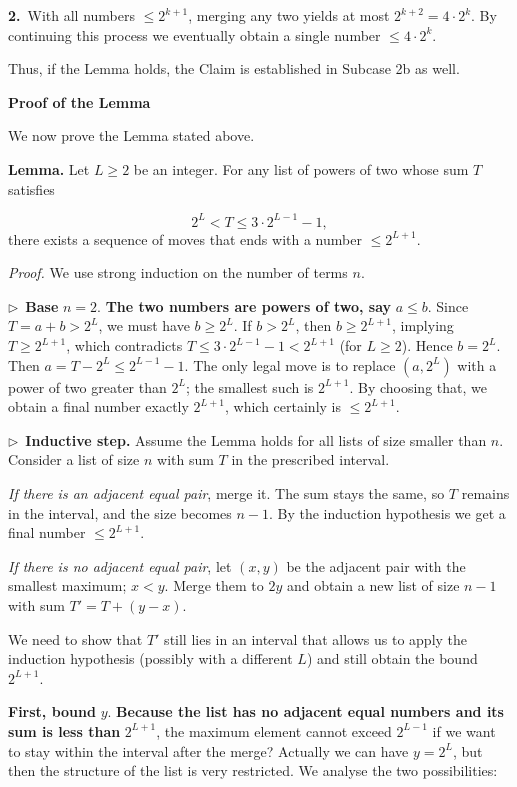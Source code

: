 \documentclass{llmxive}
\providecommand{\solutionheading}[1]{\par\smallskip\noindent\textbf{#1}\par}
\providecommand{\compactbullet}[1]{\par\noindent$\triangleright$~#1\par}
\providecommand{\compactnumber}[2]{\par\noindent\textbf{#1.}~#2\par}
\begin{document}
\compactnumber{2}{With all numbers \(\le 2^{k+1}\), merging any two yields at most \(2^{k+2} = 4 \cdot 2^{k}\).  By continuing this process we eventually obtain a single number \(\le 4 \cdot 2^{k}\).}
Thus, if the Lemma holds, the Claim is established in Subcase 2b as well.\par
\smallskip
\solutionheading{Proof of the Lemma}
We now prove the Lemma stated above.\par
\textbf{Lemma.} Let \(L \ge 2\) be an integer. For any list of powers of two whose sum \(T\) satisfies\par
\[
2^{L} < T \le 3 \cdot 2^{L-1} - 1,
\]
there exists a sequence of moves that ends with a number \(\le 2^{L+1}\).\par
\emph{Proof.} We use strong induction on the number of terms \(n\).\par
\compactbullet{\textbf{Base }\(n = 2\).\textbf{  The two numbers are powers of two, say }\(a \le b\).  Since \(T = a+b > 2^{L}\), we must have \(b \ge 2^{L}\).  If \(b > 2^{L}\), then \(b \ge 2^{L+1}\), implying \(T \ge 2^{L+1}\), which contradicts \(T \le 3 \cdot 2^{L-1} - 1 < 2^{L+1}\) (for \(L \ge 2\)).  Hence \(b = 2^{L}\).  Then \(a = T - 2^{L} \le 2^{L-1} - 1\).  The only legal move is to replace \((a, 2^{L})\) with a power of two greater than \(2^{L}\); the smallest such is \(2^{L+1}\).  By choosing that, we obtain a final number exactly \(2^{L+1}\), which certainly is \(\le 2^{L+1}\).}
\compactbullet{\textbf{Inductive step.}  Assume the Lemma holds for all lists of size smaller than \(n\).  Consider a list of size \(n\) with sum \(T\) in the prescribed interval.}
\emph{If there is an adjacent equal pair}, merge it.  The sum stays the same, so \(T\) remains in the interval, and the size becomes \(n-1\).  By the induction hypothesis we get a final number \(\le 2^{L+1}\).\par
\emph{If there is no adjacent equal pair}, let \((x, y)\) be the adjacent pair with the smallest maximum; \(x < y\).  Merge them to \(2y\) and obtain a new list of size \(n-1\) with sum \(T' = T + (y - x)\).\par
We need to show that \(T'\) still lies in an interval that allows us to apply the induction hypothesis (possibly with a different \(L\)) and still obtain the bound \(2^{L+1}\).\par
\textbf{First, bound }\(y\).\textbf{ Because the list has no adjacent equal numbers and its sum is less than }\(2^{L+1}\), the maximum element cannot exceed \(2^{L-1}\) if we want to stay within the interval after the merge? Actually we can have \(y = 2^{L}\), but then the structure of the list is very restricted. We analyse the two possibilities:\par
\end{document}
